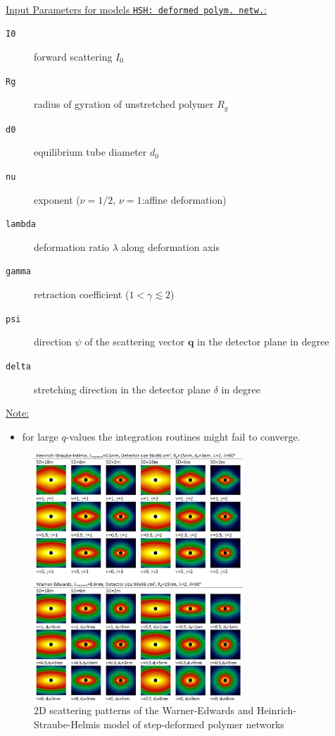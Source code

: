 \hspace{1pt}\\
\underline{Input Parameters for models \texttt{HSH: deformed polym. netw.}:}\\
\begin{description}
\item[\texttt{I0}] forward scattering $I_0$
\item[\texttt{Rg}] radius of gyration of unstretched polymer $R_g$
\item[\texttt{d0}] equilibrium tube diameter $d_0$
\item[\texttt{nu}] exponent ($\nu=1/2$, $\nu=1$:affine deformation)
\item[\texttt{lambda}] deformation ratio $\lambda$ along deformation axis

\item[\texttt{gamma}] retraction coefficient ($1 < \gamma \lesssim 2$)
\item[\texttt{psi}] direction $\psi$ of the scattering vector $\mathbf{q}$ in the detector plane in degree
\item[\texttt{delta}] stretching direction in the detector plane $\delta$ in degree
\end{description}

\underline{Note:}
\begin{itemize}
\item for large $q$-values the integration routines might fail to converge.
\end{itemize}

\begin{figure}[htb]
\begin{center}
\includegraphics[width=0.7\textwidth]{../images/form_factor/deformed_sheared/deformed_polymer_network.png}
\end{center}
\caption{2D scattering patterns of the Warner-Edwards and Heinrich-Straube-Helmis model of step-deformed polymer networks}
\label{fig:IQ2Dpolymernetwork}
\end{figure}


